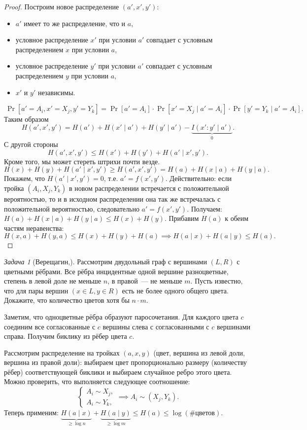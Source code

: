 \documentclass[12pt]{article}
\theoremstyle{definition}
\theoremstyle{plain}
\theoremstyle{remark}
\newtheorem{problem}{Задача}[section]
\begin{document}
\begin{proof}
    Построим новое распределение $(a',x',y')$:
    \begin{itemize}
        \item $a'$ имеет то же распределение, что и $a$,
        \item условное распределение $x'$ при условии $a'$ совпадает
            с условным распределением $x$ при условии $a$,
        \item условное распределение $y'$ при условии $a'$ совпадает
            с условным распределением $y$ при условии $a$,
        \item $x'$ и $y'$ независимы.
    \end{itemize}
    \[\
    \Pr[a'=A_i, x' = X_j, y' = Y_k] = 
    \Pr[a'=A_i]\cdot \Pr[x' = X_j\mid a'=A_i]\cdot \Pr[y' = Y_k\mid a' = A_i].
    \]
    Таким образом
    \[
        H(a',x',y') = H(a') + H(x'\mid a') + H(y'\mid a') - \underbrace{I(x':y'\mid a')}_{0}.
    \]
    С другой стороны
    \[
        H(a',x',y') \le H(x') + H(y') + H(a'\mid x',y').
    \]
    Кроме того, мы может стереть штрихи почти везде.
    \[
        H(x) + H(y) + H(a'\mid x',y') \ge H(a',x',y') = H(a) + H(x\mid a) + H(y\mid a).
    \]
    Покажем, что $H(a'\mid x', y') = 0$, т.е. $a' = f(x',y')$. Действительно: 
    если тройка $(A_i, X_j, Y_k)$ в новом распределении встречается с положительной
    вероятностью, то и в исходном распределении она так же встречалась с положительной
    вероятностью, следовательно $a' = f(x',y')$.
    Получаем: $H(a) + H(x\mid a) + H(y\mid a) \le H(x) + H(y)$. Прибавим $H(a)$ к обеим частям
    неравенства:
    \[
       H(x,a) + H(y,a) \le H(x) + H(y) + H(a)\implies H(a\mid x) + H(a \mid y) \le H(a).
    \]
\end{proof}
\begin{problem}[Верещагин,\cite{KRV18}]
    Рассмотрим двудольный граф с вершинами $(L,R)$ с цветными рёбрами.
    Все рёбра инцидентные одной вершине разноцветные, степень в левой доле не меньше $n$, 
    в правой~--- не меньше $m$. Пусть известно, что для пары вершин $(x\in L, y\in R)$
    есть не более одного общего цвета. Докажите, что количество цветов хотя бы $n\cdot m$.

    Заметим, что одноцветные рёбра образуют паросочетания. Для каждого цвета $c$ соединим все
    согласованные с $c$ вершины слева с согласованными с $c$ вершинами справа. Получим биклику из
    рёбер цвета $c$.

    Рассмотрим распределение на тройках $(a,x,y)$ (цвет, вершина из левой доли, вершина из правой
    доли): выбираем цвет пропорционально размеру (количеству рёбер) соответствующей биклики и 
    выбираем случайное ребро этого цвета. Можно проверить, что выполняется следующее соотношение:
\[
    \begin{cases}
        A_i \sim X_j,\\
        A_i \sim Y_k,
    \end{cases} \implies A_i\sim(X_j,Y_k).
\]
Теперь применим: $\underbrace{H(a\mid x)}_{\ge\log n} + 
                  \underbrace{H(a\mid y)}_{\ge\log m} \le H(a) \le \log (\text{\# цветов})$.
\end{problem}
\end{document}
